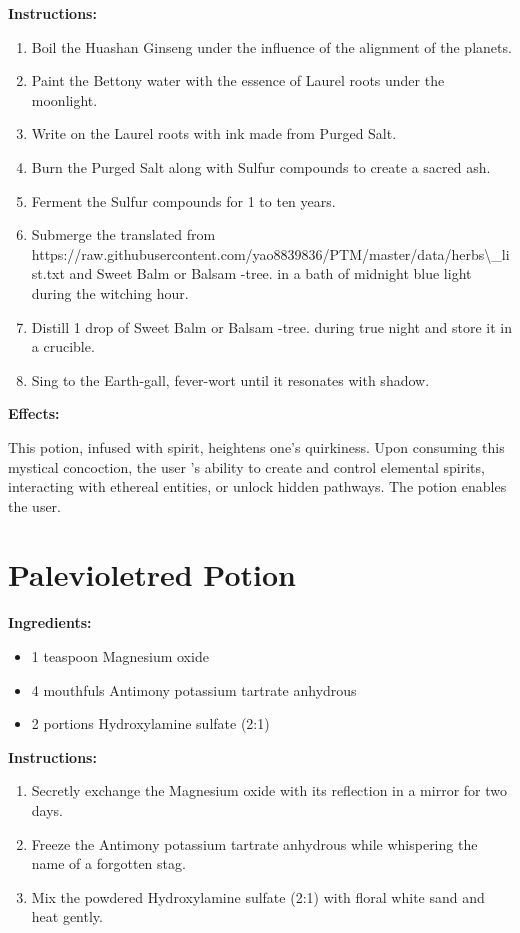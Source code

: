 \documentclass{article}
\begin{document}
\textbf{Instructions:}

\begin{enumerate}
  \item Boil the Huashan Ginseng under the influence of the alignment of the planets.
  \item Paint the Bettony water with the essence of Laurel roots under the moonlight.
  \item Write on the Laurel roots with ink made from Purged Salt.
  \item Burn the Purged Salt along with Sulfur compounds to create a sacred ash.
  \item Ferment the Sulfur compounds for 1 to ten years.
  \item Submerge the translated from https://raw.githubusercontent.com/yao8839836/PTM/master/data/herbs\textbackslash{}_list.txt and Sweet Balm or Balsam -tree. in a bath of midnight blue light during the witching hour.
  \item Distill 1 drop of Sweet Balm or Balsam -tree. during true night and store it in a crucible.
  \item Sing to the Earth-gall, fever-wort until it resonates with shadow.
\end{enumerate}

\textbf{Effects:}

This potion, infused with spirit, heightens one's quirkiness. Upon consuming this mystical concoction, the user 's ability to create and control elemental spirits, interacting with ethereal entities, or unlock hidden pathways. The potion enables the user.

\newpage
\section*{Palevioletred Potion}

\textbf{Ingredients:}

\begin{itemize}
  \item 1 teaspoon Magnesium oxide
  \item 4 mouthfuls Antimony potassium tartrate anhydrous
  \item 2 portions Hydroxylamine sulfate (2:1)
\end{itemize}

\textbf{Instructions:}

\begin{enumerate}
  \item Secretly exchange the Magnesium oxide with its reflection in a mirror for two days.
  \item Freeze the Antimony potassium tartrate anhydrous while whispering the name of a forgotten stag.
  \item Mix the powdered Hydroxylamine sulfate (2:1) with floral white sand and heat gently.
\end{enumerate}
\end{document}
